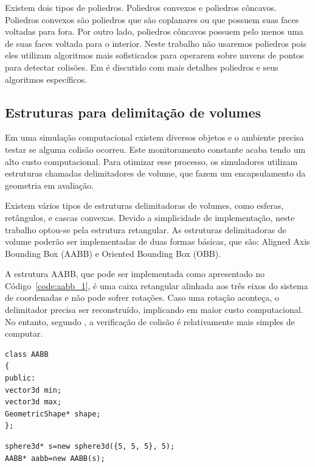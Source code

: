 Existem dois tipos de poliedros. Poliedros convexos e poliedros
côncavos. Poliedros convexos são poliedros que são coplanares ou que possuem
suas faces voltadas para fora. Por outro lado, poliedros côncavos possuem
pelo menos uma de suas faces voltada para o interior.
Neste trabalho não usaremos poliedros pois eles utilizam algoritmos mais
sofisticados para operarem sobre nuvens de pontos para detectar colisões.
Em  é discutido com mais detalhes poliedros e seus algoritmos específicos.

\subsection{ Estruturas para delimitação de volumes}

Em uma simulação computacional existem diversos objetos e o ambiente precisa testar se alguma colisão ocorreu. Este monitoramento constante acaba tendo um alto custo computacional. Para otimizar esse processo, os simuladores utilizam estruturas chamadas delimitadores de volume, que fazem um encapsulamento da geometria em avaliação.

Existem vários tipos de estruturas delimitadoras de volumes, como esferas, retângulos, e cascas convexas. Devido a simplicidade de implementação, neste trabalho optou-se pela estrutura retangular. As estruturas delimitadoras de volume poderão ser implementadas de duas formas básicas, que são: Aligned Axis Bounding Box (AABB) e Oriented Bounding Box (OBB).

A estrutura AABB, que pode ser implementada como apresentado no Código~\ref{code:aabb_1}, é uma caixa retangular alinhada aos três eixos do sistema de coordenadas e não pode sofrer rotações. Caso uma rotação aconteça, o delimitador precisa ser reconstruído, implicando em maior custo computacional. No entanto, segundo , a verificação de colisão é relativamente mais simples de computar.

\begin{lstlisting}[frame=single,caption=Exemplo de AABB\label{code:aabb_1}]
class AABB
{
public:
vector3d min;
vector3d max;
GeometricShape* shape;
};
\end{lstlisting}

\begin{lstlisting}[frame=single,caption=Exemplo de AABB e Esfera\label{code:aabbSphere}]
sphere3d* s=new sphere3d({5, 5, 5}, 5);
AABB* aabb=new AABB(s);
\end{lstlisting}


